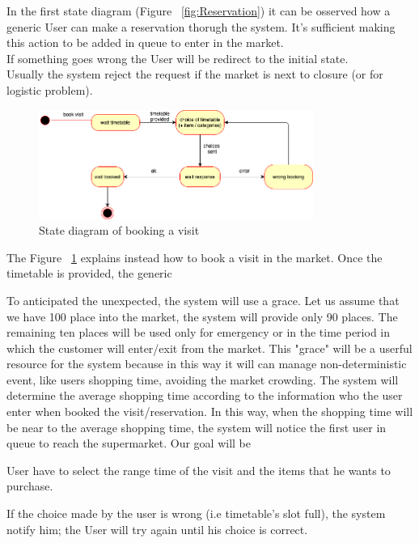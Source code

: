In the  first state diagram (Figure ~\ref{fig:Reservation}) it can be osserved how a generic User can make a reservation thorugh the system. It's sufficient making this action to be added in queue to enter in the market.
\\If something goes wrong the User will be redirect to the initial state.
\\Usually the system reject the request if the market is next to closure (or for logistic problem).

\par 
\medskip

\begin{figure}[h]
  \caption{State diagram of booking a visit}
  \label{fig:Visit}
  \centering
  \includegraphics[width=0.8\textwidth, height=0.4\textwidth]{diagrams/2-visit.png}
\end{figure}

\par 
\medskip

The Figure ~\ref{fig:Visit} explains instead how to book a visit in the market. Once the timetable is provided, the generic 



To anticipated the unexpected, the system will use a grace.
Let us assume that we have 100 place into the market, the system will provide only 90 places.
The remaining ten places will be used only for emergency or in the time period in which the customer will enter/exit from the market.
This "grace" will be a userful resource for the system because in this way it will can manage non-deterministic event, like users shopping time, avoiding the market crowding. 
The system will determine the average shopping time according to the information who the user enter when booked the visit/reservation.
In this way, when the shopping time will be near to the average shopping time, the system will notice the first user in queue to reach the supermarket.  
Our goal will be 


User have to select the range time of the visit and the items that he wants to purchase. \par If the choice made by the user is wrong (i.e timetable's slot full), the system notify him; the User will try again until his choice is correct.
\par 
\medskip


